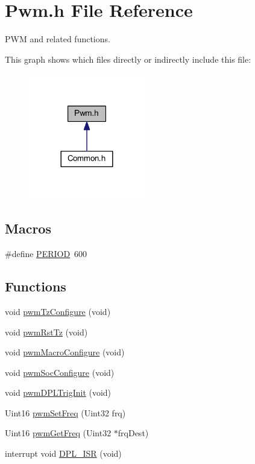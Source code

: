 \hypertarget{a00026}{\section{Pwm.\-h File Reference}
\label{a00026}
}


P\-W\-M and related functions.  


This graph shows which files directly or indirectly include this file\-:
\nopagebreak
\begin{figure}[H]
\begin{center}
\leavevmode
\includegraphics[width=144pt]{a00052}
\end{center}
\end{figure}
\subsection*{Macros}
\begin{DoxyCompactItemize}
\item 
\#define \hyperlink{a00026_af281425e62298bac2df0fbe8690a4844}{P\-E\-R\-I\-O\-D}~600
\end{DoxyCompactItemize}
\subsection*{Functions}
\begin{DoxyCompactItemize}
\item 
void \hyperlink{a00026_aced17503c602f9e71a2d101e956cce23}{pwm\-Tz\-Configure} (void)
\item 
void \hyperlink{a00026_a94a47896496e094f8ab54c1cb46da2e1}{pwm\-Rst\-Tz} (void)
\item 
void \hyperlink{a00026_acc68120fcdfa36145370c31a61eb23a7}{pwm\-Macro\-Configure} (void)
\item 
void \hyperlink{a00026_a358d8706acd0faf4e1cc705129be6548}{pwm\-Soc\-Configure} (void)
\item 
void \hyperlink{a00026_adfbaf2bb56a0c9fe6f54826499cb57de}{pwm\-D\-P\-L\-Trig\-Init} (void)
\item 
Uint16 \hyperlink{a00026_af82e2c1ff72afc3de42eb172ca925956}{pwm\-Set\-Freq} (Uint32 frq)
\item 
Uint16 \hyperlink{a00026_a79f203a5167440096f2ba270813b6db2}{pwm\-Get\-Freq} (Uint32 $\ast$frq\-Dest)
\item 
interrupt void \hyperlink{a00026_a5532a53363218854b0e4b15049d773f7}{D\-P\-L\-\_\-\-I\-S\-R} (void)
\end{DoxyCompactItemize}
